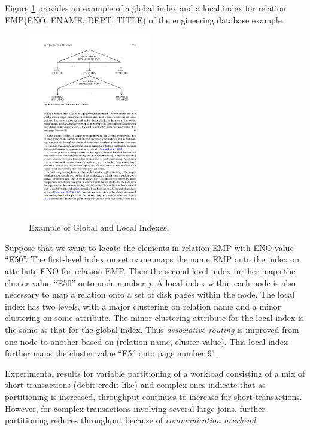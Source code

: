 \documentclass{vldb}
\begin{document}
Figure \ref{fig:indexes} provides an example of a global index and a local index for relation EMP(ENO, ENAME, DEPT, TITLE) of the engineering database example.

\begin{figure}[htb]
\centering
\includegraphics[width=0.48\textwidth]{indexes}
\caption{Example of Global and Local Indexes.}
\label{fig:indexes}
\end{figure}

Suppose that we want to locate the elements in relation EMP with ENO value “E50”. The first-level index on set name maps the name EMP onto the index on attribute ENO for relation EMP. Then the second-level index further maps the cluster value “E50” onto node number $j$. A local index within each node is also necessary to map a relation onto a set of disk pages within the node. The local index has two levels, with a major clustering on relation name and a minor clustering on some attribute. The minor clustering attribute for the local index is the same as that for the global index. Thus \textit{associative routing} is improved from one node to another based on (relation name, cluster value). This local index further maps the cluster value “E5” onto page number 91.

Experimental results for variable partitioning of a workload consisting of a mix of short transactions (debit-credit like) and complex ones indicate that as partitioning is increased, throughput continues to increase for short transactions. However, for complex transactions involving several large joins, further partitioning reduces throughput because of \textit{communication overhead}.
\end{document}
